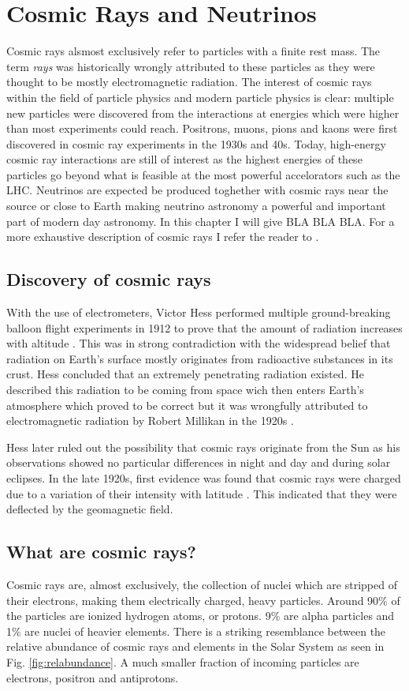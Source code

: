 \chapter{Cosmic Rays and Neutrinos}
Cosmic rays alsmost exclusively refer to particles with a finite rest mass. The term \textit{rays} was historically wrongly attributed to these particles as they were thought to be mostly electromagnetic radiation.
The interest of cosmic rays within the field of particle physics and modern particle physics is clear: multiple new particles were discovered from the interactions at energies which were higher than most experiments could reach. Positrons, muons, pions and kaons were first discovered in cosmic ray experiments in the 1930s and 40s. Today, high-energy cosmic ray interactions are still of interest as the highest energies of these particles go beyond what is feasible at the most powerful accelorators such as the LHC. Neutrinos are expected be produced toghether with cosmic rays near the source or close to Earth making neutrino astronomy a powerful and important part of modern day astronomy. In this chapter I will give BLA BLA BLA. For a more exhaustive description of cosmic rays I refer the reader to \cite{Gaisser:2016uoy}.


\section{Discovery of cosmic rays}
With the use of electrometers, Victor Hess performed multiple ground-breaking balloon flight experiments in 1912 to prove that the amount of radiation increases with altitude \cite{hessnobel:1936}. This was in strong contradiction with the widespread belief that radiation on Earth's surface mostly originates from radioactive substances in its crust. Hess concluded that an extremely penetrating radiation existed. He described this radiation to be coming from space wich then enters Earth's atmosphere which proved to be correct but it was wrongfully attributed to electromagnetic radiation by Robert Millikan in the 1920s \cite{PhysRev.32.533}. 

Hess later ruled out the possibility that cosmic rays originate from the Sun as his observations showed no particular differences in night and day and during solar eclipses. In the late 1920s, first evidence was found that cosmic rays were charged due to a variation of their intensity with latitude \cite{clay:1927a}. This indicated that they were deflected by the geomagnetic field.

\section{What are cosmic rays?}
Cosmic rays are, almost exclusively, the collection of nuclei which are stripped of their electrons, making them electrically charged, heavy particles. Around 90\% of the particles are ionized hydrogen atoms, or protons. 9\% are alpha particles and 1\% are nuclei of heavier elements. There is a striking resemblance between the relative abundance of cosmic rays and elements in the Solar System as seen in Fig. \ref{fig:relabundance}. A much smaller fraction of incoming particles are electrons, positron and antiprotons.


